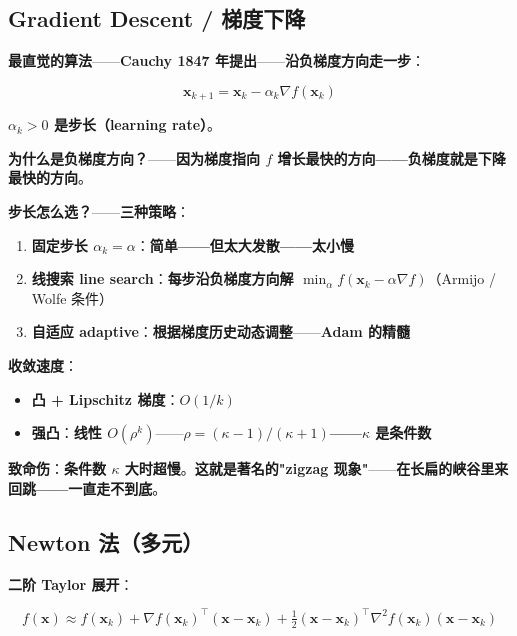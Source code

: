 \subsection{Gradient Descent / 梯度下降}

\textbf{最直觉的算法}——\textbf{Cauchy 1847 年提出}——\textbf{沿\textbf{负梯度}方向走一步}：

\begin{equation}
\boxed{\, \bm x_{k+1} = \bm x_k - \alpha_k \nabla f(\bm x_k) \,}
\end{equation}

\textbf{$\alpha_k > 0$ 是\textbf{步长}（learning rate）}。

\textbf{为什么是负梯度方向？}——\textbf{因为梯度指向 $f$ 增长最快的方向——负梯度就是下降最快的方向}。

\textbf{步长怎么选？}——\textbf{三种策略}：

\begin{enumerate}
\item \textbf{固定步长 $\alpha_k = \alpha$}：\textbf{简单——但太大发散——太小慢}
\item \textbf{线搜索 line search}：\textbf{每步沿负梯度方向解 $\min_\alpha f(\bm x_k - \alpha \nabla f)$}（Armijo / Wolfe 条件）
\item \textbf{自适应 adaptive}：\textbf{根据梯度历史动态调整}——\textbf{Adam 的精髓}
\end{enumerate}

\textbf{收敛速度}：

\begin{itemize}
\item \textbf{凸 + Lipschitz 梯度}：$O(1/k)$
\item \textbf{强凸}：\textbf{线性 $O(\rho^k)$}——\textbf{$\rho = (\kappa - 1)/(\kappa+1)$——$\kappa$ 是条件数}
\end{itemize}

\textbf{致命伤}：\textbf{条件数 $\kappa$ 大时\textbf{超慢}}。\textbf{这就是著名的"\textbf{zigzag 现象}"}——\textbf{在长扁的峡谷里来回跳——一直走不到底}。

\subsection{Newton 法（多元）}

\textbf{二阶 Taylor 展开}：

\begin{equation}
f(\bm x) \approx f(\bm x_k) + \nabla f(\bm x_k)^\top (\bm x - \bm x_k) + \tfrac{1}{2}(\bm x - \bm x_k)^\top \nabla^2 f(\bm x_k) (\bm x - \bm x_k)
\end{equation}

